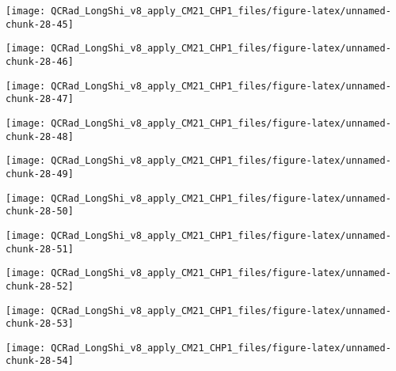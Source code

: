 \documentclass[
  10pt,
  a4paper,oneside]{article}
\begin{document}
\begin{center}\texttt{[image: QCRad\_LongShi\_v8\_apply\_CM21\_CHP1\_files/figure-latex/unnamed-chunk-28-45]} \end{center}

\begin{center}\texttt{[image: QCRad\_LongShi\_v8\_apply\_CM21\_CHP1\_files/figure-latex/unnamed-chunk-28-46]} \end{center}

\begin{center}\texttt{[image: QCRad\_LongShi\_v8\_apply\_CM21\_CHP1\_files/figure-latex/unnamed-chunk-28-47]} \end{center}

\begin{center}\texttt{[image: QCRad\_LongShi\_v8\_apply\_CM21\_CHP1\_files/figure-latex/unnamed-chunk-28-48]} \end{center}

\begin{center}\texttt{[image: QCRad\_LongShi\_v8\_apply\_CM21\_CHP1\_files/figure-latex/unnamed-chunk-28-49]} \end{center}

\begin{center}\texttt{[image: QCRad\_LongShi\_v8\_apply\_CM21\_CHP1\_files/figure-latex/unnamed-chunk-28-50]} \end{center}

\begin{center}\texttt{[image: QCRad\_LongShi\_v8\_apply\_CM21\_CHP1\_files/figure-latex/unnamed-chunk-28-51]} \end{center}

\begin{center}\texttt{[image: QCRad\_LongShi\_v8\_apply\_CM21\_CHP1\_files/figure-latex/unnamed-chunk-28-52]} \end{center}

\begin{center}\texttt{[image: QCRad\_LongShi\_v8\_apply\_CM21\_CHP1\_files/figure-latex/unnamed-chunk-28-53]} \end{center}

\begin{center}\texttt{[image: QCRad\_LongShi\_v8\_apply\_CM21\_CHP1\_files/figure-latex/unnamed-chunk-28-54]} \end{center}
\end{document}
